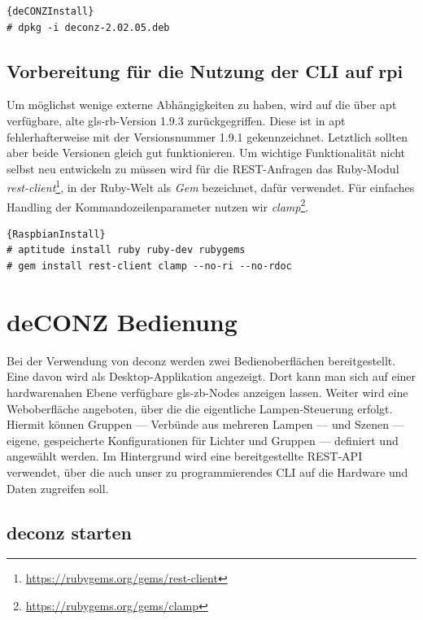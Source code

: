 \documentclass[a4paper,12pt]{article}
\begin{document}
\begin{lstlisting}[caption=deCONZ installieren]{deCONZInstall}
# dpkg -i deconz-2.02.05.deb
\end{lstlisting}

\subsection{Vorbereitung für die Nutzung der CLI auf \gls{rpi}}

Um möglichst wenige externe Abhängigkeiten zu haben, wird auf die über
\gls{apt} verfügbare, alte \gls{gls-rb}-Version 1.9.3 zurückgegriffen. Diese
ist in \gls{apt} fehlerhafterweise mit der Versionsnummer 1.9.1 gekennzeichnet.
Letztlich sollten aber beide Versionen gleich gut funktionieren. Um wichtige
Funktionalität nicht selbst neu entwickeln zu müssen wird für die REST-Anfragen
das Ruby-Modul
\emph{rest-client}\footnote{\url{https://rubygems.org/gems/rest-client}}, in
der Ruby-Welt als \emph{Gem} bezeichnet, dafür verwendet. Für einfaches
Handling der Kommandozeilenparameter nutzen wir
\emph{clamp}\footnote{\url{https://rubygems.org/gems/clamp}}.

\begin{lstlisting}[caption=Ruby und Ruby-Modulmanager installieren]{RaspbianInstall}
# aptitude install ruby ruby-dev rubygems
# gem install rest-client clamp --no-ri --no-rdoc
\end{lstlisting}

\section{deCONZ Bedienung}
\label{deconz}

Bei der Verwendung von \acrshort{deconz} werden zwei Bedienoberflächen
bereitgestellt. Eine davon wird als Desktop-Applikation angezeigt. Dort kann
man sich auf einer hardwarenahen Ebene verfügbare \gls{gls-zb}-Nodes anzeigen
lassen. Weiter wird eine Weboberfläche angeboten, über die die eigentliche
Lampen-Steuerung erfolgt. Hiermit können Gruppen --- Verbünde aus mehreren
Lampen --- und Szenen --- eigene, gespeicherte Konfigurationen für Lichter und
Gruppen --- definiert und angewählt werden. Im Hintergrund wird eine
bereitgestellte REST-API verwendet, über die auch unser zu programmierendes CLI
auf die Hardware und Daten zugreifen soll.

\subsection{\acrshort{deconz} starten}
\end{document}
